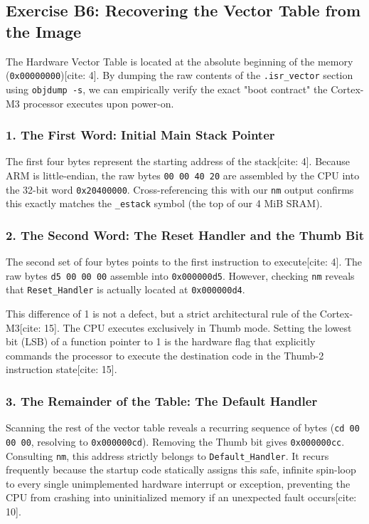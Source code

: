 \subsection{Exercise B6: Recovering the Vector Table from the Image}
The Hardware Vector Table is located at the absolute beginning of the memory (\texttt{0x00000000})[cite: 4]. By dumping the raw contents of the \texttt{.isr\_vector} section using \texttt{objdump -s}, we can empirically verify the exact "boot contract" the Cortex-M3 processor executes upon power-on.

\subsubsection{1. The First Word: Initial Main Stack Pointer}
The first four bytes represent the starting address of the stack[cite: 4]. Because ARM is little-endian, the raw bytes \texttt{00 00 40 20} are assembled by the CPU into the 32-bit word \texttt{0x20400000}.
Cross-referencing this with our \texttt{nm} output confirms this exactly matches the \texttt{\_estack} symbol (the top of our 4 MiB SRAM).

\subsubsection{2. The Second Word: The Reset Handler and the Thumb Bit}
The second set of four bytes points to the first instruction to execute[cite: 4]. The raw bytes \texttt{d5 00 00 00} assemble into \texttt{0x000000d5}.
However, checking \texttt{nm} reveals that \texttt{Reset\_Handler} is actually located at \texttt{0x000000d4}. 

This difference of 1 is not a defect, but a strict architectural rule of the Cortex-M3[cite: 15]. The CPU executes exclusively in Thumb mode. Setting the lowest bit (LSB) of a function pointer to 1 is the hardware flag that explicitly commands the processor to execute the destination code in the Thumb-2 instruction state[cite: 15]. 

\subsubsection{3. The Remainder of the Table: The Default Handler}
Scanning the rest of the vector table reveals a recurring sequence of bytes (\texttt{cd 00 00 00}, resolving to \texttt{0x000000cd}). Removing the Thumb bit gives \texttt{0x000000cc}. 
Consulting \texttt{nm}, this address strictly belongs to \texttt{Default\_Handler}. It recurs frequently because the startup code statically assigns this safe, infinite spin-loop to every single unimplemented hardware interrupt or exception, preventing the CPU from crashing into uninitialized memory if an unexpected fault occurs[cite: 10].

